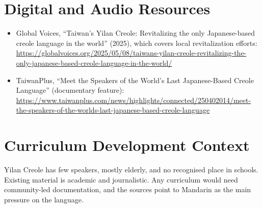 \documentclass[12pt]{article}
\begin{document}
\section{Digital and Audio Resources}
\begin{itemize}
\item Global Voices, ``Taiwan's Yilan Creole: Revitalizing the only Japanese-based creole language in the world'' (2025), which covers local revitalization efforts: \url{https://globalvoices.org/2025/05/08/taiwans-yilan-creole-revitalizing-the-only-japanese-based-creole-language-in-the-world/}
\item TaiwanPlus, ``Meet the Speakers of the World's Last Japanese-Based Creole Language'' (documentary feature): \url{https://www.taiwanplus.com/news/highlights/connected/250402014/meet-the-speakers-of-the-worlds-last-japanese-based-creole-language}
\end{itemize}

\section{Curriculum Development Context}
Yilan Creole has few speakers, mostly elderly, and no recognised place in schools. Existing material is academic and journalistic. Any curriculum would need community-led documentation, and the sources point to Mandarin as the main pressure on the language.
\end{document}
